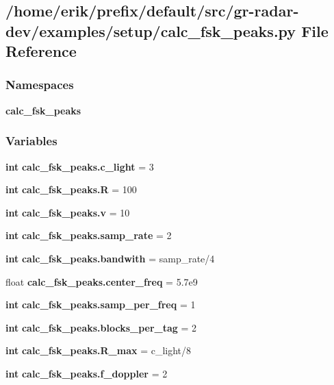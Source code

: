 \subsection{/home/erik/prefix/default/src/gr-\/radar-\/dev/examples/setup/calc\+\_\+fsk\+\_\+peaks.py File Reference}
\label{calc__fsk__peaks_8py}
\subsubsection*{Namespaces}
\begin{DoxyCompactItemize}
\item 
 {\bf calc\+\_\+fsk\+\_\+peaks}
\end{DoxyCompactItemize}
\subsubsection*{Variables}
\begin{DoxyCompactItemize}
\item 
{\bf int} {\bf calc\+\_\+fsk\+\_\+peaks.\+c\+\_\+light} = 3
\item 
{\bf int} {\bf calc\+\_\+fsk\+\_\+peaks.\+R} = 100
\item 
{\bf int} {\bf calc\+\_\+fsk\+\_\+peaks.\+v} = 10
\item 
{\bf int} {\bf calc\+\_\+fsk\+\_\+peaks.\+samp\+\_\+rate} = 2
\item 
{\bf int} {\bf calc\+\_\+fsk\+\_\+peaks.\+bandwith} = samp\+\_\+rate/4
\item 
float {\bf calc\+\_\+fsk\+\_\+peaks.\+center\+\_\+freq} = 5.\+7e9
\item 
{\bf int} {\bf calc\+\_\+fsk\+\_\+peaks.\+samp\+\_\+per\+\_\+freq} = 1
\item 
{\bf int} {\bf calc\+\_\+fsk\+\_\+peaks.\+blocks\+\_\+per\+\_\+tag} = 2
\item 
{\bf int} {\bf calc\+\_\+fsk\+\_\+peaks.\+R\+\_\+max} = c\+\_\+light/8
\item 
{\bf int} {\bf calc\+\_\+fsk\+\_\+peaks.\+f\+\_\+doppler} = 2
\end{DoxyCompactItemize}
